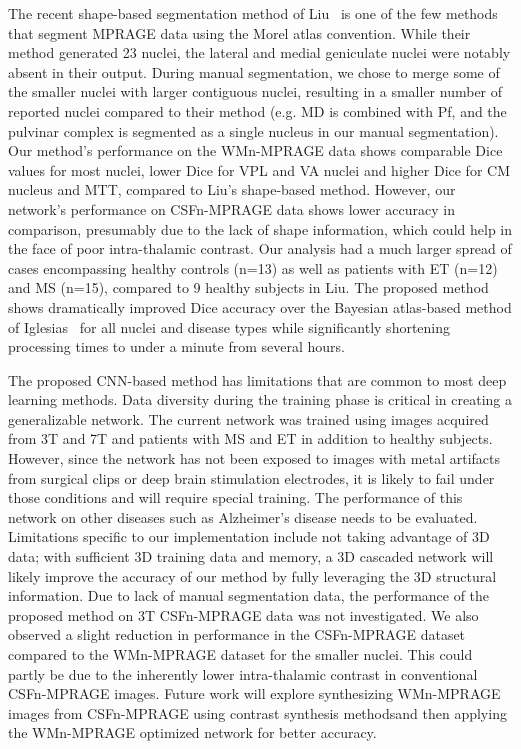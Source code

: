 The recent shape-based segmentation method of Liu~\cite{1921968:27964372} is one of the few methods that segment MPRAGE data using the Morel atlas convention. While their method generated 23 nuclei, the lateral and medial geniculate nuclei were notably absent in their output. During manual segmentation, we chose to merge some of the smaller nuclei with larger contiguous nuclei, resulting in a smaller number of reported nuclei compared to their method (e.g. MD is combined with Pf, and the pulvinar complex is segmented as a single nucleus in our manual segmentation). Our method's performance on the WMn-MPRAGE data shows comparable Dice values for most nuclei, lower Dice for VPL and VA nuclei and higher Dice for CM nucleus and MTT, compared to Liu's shape-based method. However, our network's performance on CSFn-MPRAGE data shows lower accuracy in comparison, presumably due to the lack of shape information, which could help in the face of poor intra-thalamic contrast. Our analysis had a much larger spread of cases encompassing healthy controls (n=13) as well as patients with ET (n=12) and MS (n=15), compared to 9 healthy subjects in Liu. The proposed method shows dramatically improved Dice accuracy over the Bayesian atlas-based method of Iglesias~\cite{1921968:27964310} for all nuclei and disease types while significantly shortening processing times to under a minute from several hours.

The proposed CNN-based method has limitations that are common to most deep learning methods. Data diversity during the training phase is critical in creating a generalizable network. The current network was trained using images acquired from 3T and 7T and patients with MS and ET in addition to healthy subjects. However, since the network has not been exposed to images with metal artifacts from surgical clips or deep brain stimulation electrodes, it is likely to fail under those conditions and will require special training. The performance of this network on other diseases such as Alzheimer's disease needs to be evaluated. Limitations specific to our implementation include not taking advantage of 3D data; with sufficient 3D training data and memory, a 3D cascaded network will likely improve the accuracy of our method by fully leveraging the 3D structural information. Due to lack of manual segmentation data, the performance of the proposed method on 3T CSFn-MPRAGE data was not investigated. We also observed a slight reduction in performance in the CSFn-MPRAGE dataset compared to the WMn-MPRAGE dataset for the smaller nuclei. This could partly be due to the inherently lower intra-thalamic contrast in conventional CSFn-MPRAGE images. Future work will explore synthesizing WMn-MPRAGE images from CSFn-MPRAGE using contrast synthesis methodsand then applying the WMn-MPRAGE optimized network for better accuracy.


